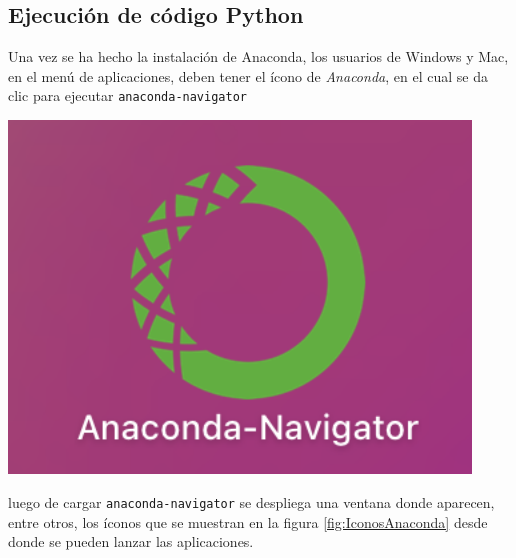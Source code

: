 \documentclass[
]{book}
\theoremstyle{definition}
\theoremstyle{definition}
\theoremstyle{definition}
\theoremstyle{definition}
\theoremstyle{remark}
\begin{document}
\hypertarget{ejecuciuxf3n-de-cuxf3digo-python}{%
\subsection{Ejecución de código Python}\label{ejecuciuxf3n-de-cuxf3digo-python}}

Una vez se ha hecho la instalación de Anaconda, los usuarios de Windows y Mac, en el menú de aplicaciones, deben tener el ícono de \emph{Anaconda}, en el cual se da clic para ejecutar \texttt{anaconda-navigator}

\includegraphics[width=4.83in]{anacondaNavIcon}

luego de cargar \texttt{anaconda-navigator} se despliega una ventana donde aparecen, entre otros, los íconos que se muestran en la figura \ref{fig:IconosAnaconda} desde donde se pueden lanzar las aplicaciones.
\end{document}
